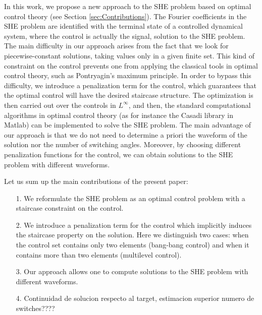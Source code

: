\documentclass[twocolumn]{autart}    %
\begin{document}
In this work, we propose a new approach to the SHE problem based on optimal control theory (see Section \ref{sec:Contributions}). 
%
The Fourier coefficients in the SHE problem are identified with the terminal state of a controlled dynamical system, where the control is actually the signal, solution to the SHE problem.
The main difficulty in our approach arises from the fact that we look for piecewise-constant solutions, taking values only in a given finite set.
%
This kind of constraint on the control prevents one from applying the classical tools in optimal control theory, such as Pontryagin's maximum principle.
In order to bypass this difficulty, we introduce a penalization term for the control, which guarantees that the optimal control will have the desired staircase structure.
The optimization is then carried out over the controls in $L^\infty$, and then, the standard computational algorithms in optimal control theory ({\color{red}as for instance the Casadi library in Matlab}) can be implemented to solve the SHE problem.
The main advantage of our approach is that we do not need to determine a priori the waveform of the solution nor the number of switching angles.
Moreover, by choosing different penalization functions for the control, we can obtain solutions to the SHE problem with different waveforms.


Let us sum up the main contributions of the present paper:
\begin{enumerate}
    \item[1.] We reformulate the SHE problem as an optimal control problem with a staircase constraint on the control.
    \item[2.] We introduce a penalization term for the control which implicitly induces the staircase property on the solution. Here we distinguish two cases: when the control set contains only two elements (bang-bang control) and when it contains more than two elements (multilevel control).
    \item[3.] Our approach allows one to compute solutions to the SHE problem with different waveforms.
    \item[4.] {\color{red} Continuidad de solucion respecto al target, estimacion superior numero de switches???? }
\end{enumerate}


\end{document}
